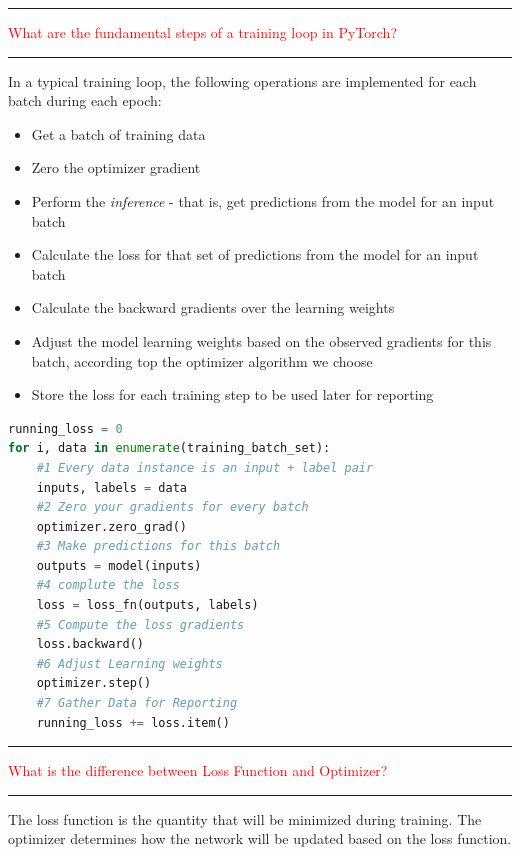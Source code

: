 \documentclass{article}
\begin{document}
\noindent
{\color{red} \rule{\linewidth}{0.5mm}}
\textcolor{red}{What are the fundamental steps of a training loop in PyTorch?} \\
\noindent
{\color{red} \rule{\linewidth}{0.5mm}}
In a typical training loop, the following operations are implemented for each batch during each epoch:
\begin{itemize}
    \item Get a batch of training data
    \item Zero the optimizer gradient
    \item Perform the \textit{inference} - that is, get predictions from the model for an input batch
    \item Calculate the loss for that set of predictions from the model for an input batch
    \item Calculate the backward gradients over the learning weights
    \item Adjust the model learning weights based on the observed gradients for this batch, according top the optimizer algorithm we choose
    \item Store the loss for each training step to be used later for reporting
\end{itemize}
\begin{lstlisting}[language=Python]
running_loss = 0
for i, data in enumerate(training_batch_set):
    #1 Every data instance is an input + label pair
    inputs, labels = data
    #2 Zero your gradients for every batch
    optimizer.zero_grad()
    #3 Make predictions for this batch
    outputs = model(inputs)
    #4 complute the loss
    loss = loss_fn(outputs, labels)
    #5 Compute the loss gradients
    loss.backward()
    #6 Adjust Learning weights
    optimizer.step()
    #7 Gather Data for Reporting
    running_loss += loss.item()
\end{lstlisting}
\noindent
{\color{red} \rule{\linewidth}{0.5mm}}
\textcolor{red}{What is the difference between Loss Function and Optimizer?} \\
\noindent
{\color{red} \rule{\linewidth}{0.5mm}}
The loss function is the quantity that will be minimized during training. The optimizer determines how the network will be updated based on the loss function. \\
\end{document}
